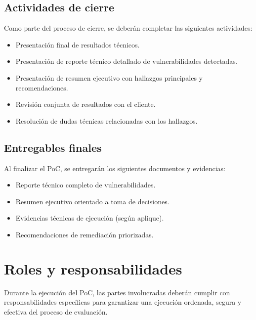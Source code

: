 \documentclass[a4paper]{article}
\begin{document}
    \subsection{Actividades de cierre}
    Como parte del proceso de cierre, se deberán completar las siguientes actividades:\\
    \begin{itemize}
        \item Presentación final de resultados técnicos.
        \item Presentación de reporte técnico detallado de vulnerabilidades detectadas.
        \item Presentación de resumen ejecutivo con hallazgos principales y recomendaciones.
        \item Revisión conjunta de resultados con el cliente.
        \item Resolución de dudas técnicas relacionadas con los hallazgos.
    \end{itemize}

    \subsection{Entregables finales}
    Al finalizar el PoC, se entregarán los siguientes documentos y evidencias:\\
    \begin{itemize}
        \item Reporte técnico completo de vulnerabilidades.
        \item Resumen ejecutivo orientado a toma de decisiones.
        \item Evidencias técnicas de ejecución (según aplique).
        \item Recomendaciones de remediación priorizadas.
    \end{itemize}

    \section{Roles y responsabilidades}
    Durante la ejecución del PoC, las partes involucradas deberán cumplir con responsabilidades específicas para garantizar una ejecución ordenada, segura y efectiva del proceso de evaluación.
\end{document}
